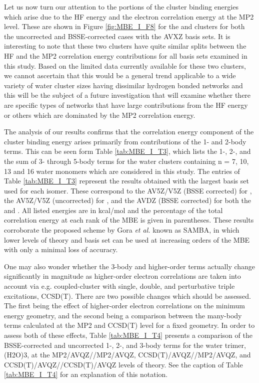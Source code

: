 \documentclass [11pt, proquest] {uwthesis}[2020/02/24]
\begin{document}
\par Let us now turn our attention to the portions of the cluster binding energies which arise due to the HF energy and the electron correlation energy at the MP2 level. These are shown in Figure \ref{fig:MBE_I_F8} for the  and  clusters for both the uncorrected and BSSE-corrected cases with the AVXZ basis sets. It is interesting to note that these two clusters have quite similar splits between the HF and the MP2 correlation energy contributions for all basis sets examined in this study. Based on the limited data currently available for these two clusters, we cannot ascertain that this would be a general trend applicable to a wide variety of water cluster sizes having dissimilar hydrogen bonded networks and this will be the subject of a future investigation that will examine whether there are specific types of networks that have large contributions from the HF energy or others which are dominated by the MP2 correlation energy.

\par The analysis of our results confirms that the correlation energy component of the cluster binding energy arises primarily from contributions of the 1- and 2-body terms. This can be seen form Table \ref{tab:MBE_I_T3}, which lists the 1-, 2-, and the sum of 3- through 5-body terms for the water clusters containing n = 7, 10, 13 and 16 water monomers which are considered in this study. The entries of Table \ref{tab:MBE_I_T3} represent the results obtained with the largest basis set used for each isomer. These correspond to the AV5Z/V5Z (BSSE corrected) for , the AV5Z/V5Z (uncorrected) for , and the AVDZ (BSSE corrected) for both the  and . All listed energies are in kcal/mol and the percentage of the total correlation energy at each rank of the MBE is given in parentheses. These results corroborate the proposed scheme by Gora \textit{et al.} known as SAMBA,\autocite{gora_interaction_2011} in which lower levels of theory and basis set can be used at increasing orders of the MBE with only a minimal loss of accuracy.

\par One may also wonder whether the 3-body and higher-order terms actually change significantly in magnitude as higher-order electron correlations are taken into account via e.g. coupled-cluster with single, double, and perturbative triple excitations, CCSD(T). There are two possible changes which should be assessed. The first being the effect of higher-order electron correlations on the minimum energy geometry, and the second being a comparison between the many-body terms calculated at the MP2 and CCSD(T) level for a fixed geometry. In order to assess both of these effects, Table \ref{tab:MBE_I_T4} presents a comparison of the BSSE-corrected and uncorrected 1-, 2-, and 3-body terms for the water trimer, (H2O)3, at the MP2/AVQZ//MP2/AVQZ, CCSD(T)/AVQZ//MP2/AVQZ, and CCSD(T)/AVQZ//CCSD(T)/AVQZ levels of theory. See the caption of Table \ref{tab:MBE_I_T4} for an explanation of this notation.
\end{document}
